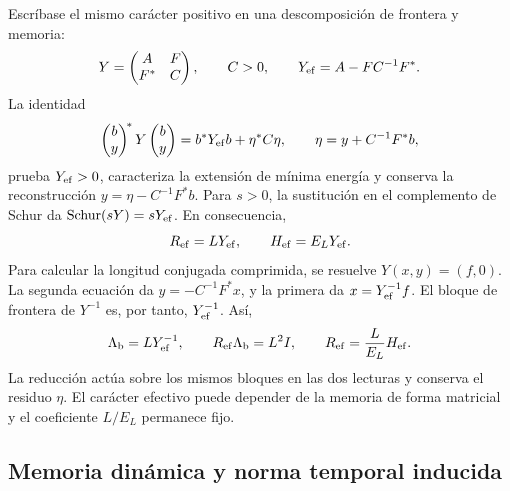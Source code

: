 Escríbase el mismo carácter positivo en una descomposición de frontera
y memoria:
\[
 Y=\begin{pmatrix}A&F\\F^*&C\end{pmatrix},\qquad C>0,
 \qquad Y_{\rm ef}=A-FC^{-1}F^*.
\]
La identidad
\[
 \begin{pmatrix}b\\y\end{pmatrix}^{\!*}Y
 \begin{pmatrix}b\\y\end{pmatrix}
 =b^*Y_{\rm ef}b+\eta^*C\eta,
 \qquad \eta=y+C^{-1}F^*b,
\]
prueba \(Y_{\rm ef}>0\), caracteriza la extensión de mínima energía y
conserva la reconstrucción \(y=\eta-C^{-1}F^*b\). Para \(s>0\),
la sustitución en el complemento de Schur da
\(\operatorname{Schur}(sY)=sY_{\rm ef}\). En consecuencia,
\[
 R_{\rm ef}=LY_{\rm ef},\qquad
 H_{\rm ef}=E_{L}Y_{\rm ef}.
\]
Para calcular la longitud conjugada comprimida, se resuelve
\(Y(x,y)=(f,0)\). La segunda ecuación da
\(y=-C^{-1}F^*x\), y la primera da
\(x=Y_{\rm ef}^{-1}f\). El bloque de frontera de \(Y^{-1}\) es,
por tanto, \(Y_{\rm ef}^{-1}\). Así,
\begin{equation}
 \Lambda_{\rm b}=LY_{\rm ef}^{-1},\qquad
 R_{\rm ef}\Lambda_{\rm b}=L^2I,\qquad
 R_{\rm ef}=\frac{L}{E_{L}}H_{\rm ef}.
 \label{g26:eq:schur-reciproco-es}
\end{equation}
La reducción actúa sobre los mismos bloques en las dos lecturas y
conserva el residuo \(\eta\). El carácter efectivo puede depender de
la memoria de forma matricial y el coeficiente \(L/E_{L}\) permanece fijo.

\subsection{Memoria dinámica y norma temporal inducida}

